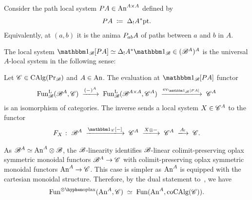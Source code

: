 \documentclass[english,svgnames,table]{article}
\begin{document}
    \begin{definition}
        Consider the path local system $P A \in \mathrm{An}^{A \times A}$ defined by
        \begin{equation*}
            P A \;\coloneq\; \Delta_! A^* \mathrm{pt}.
        \end{equation*}
        Equivalently, at $(a,b)$ it is the anima $P_{ab}A$ of paths between $a$ and $b$ in $A$.
    \end{definition}


    The local system $\ounit_{\basecat}[\Path A] \simeq \Delta_! A^* \ounit_{\basecat} \in (\basecat^A)^A$ is the universal $A$-local system in the following sense:
    \begin{proposition}
    \label{prop:classification-of-functors}
        Let $\mathscr{C}\in\operatorname{CAlg}(\operatorname{Pr}_{\mathscr{B}})$ and $A\in\mathrm{An}$. The evaluation at $\ounit_{\basecat}[\Path A]$ functor
        \begin{equation*}
            \FunB(\basecat^A, \cC) \;\xtoo{(-)^A}\; \FunB(\basecat^{A\times A}, \cC^A) \;\xtoo{\ev_{\ounit_{\basecat}[\Path A]}}\; \cC^A
        \end{equation*}
        is an isomorphism of categories.
        The inverse sends a local system $X\in \mathscr{C}^A$ to the functor
        \begin{equation*}
            F_X \;\colon\; \basecat^A \;\xtoo{\ounit_{\cC}[-]}\; \cC^A \;\xtoo{X\otimes -}\; \cC^A \;\xtoo{A_!}\; \cC.
        \end{equation*}
    \end{proposition}
    
    As $\mathscr{B}^A \simeq \mathrm{An}^A \otimes \mathscr{B}$, the $\mathscr{B}$-linearity identifies $\mathscr{B}$-linear colimit-preserving oplax symmetric monoidal functors $\mathscr{B}^A \to \mathscr{C}$ with colimit-preserving oplax symmetric monoidal functors $\mathrm{An}^A \to \mathscr{C}$. This case is simpler as $\mathrm{An}^A$ is equipped with the cartesian monoidal structure. Therefore, by the dual statement to~\cite[Theorem~2.4.3.18]{Lurie-HA}, we have
    \begin{equation*}
        \Funooplax(\An^A, \cC) \;\simeq\; \Fun(\An^A, \coCAlg(\cC)).
    \end{equation*}
\end{document}
